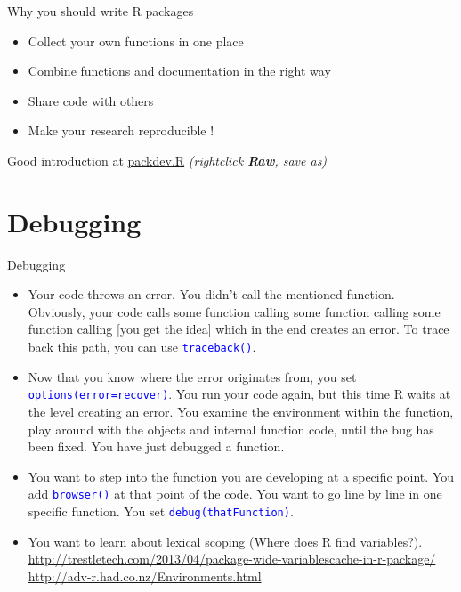 \documentclass[xcolor=table,      handout ,    xcolor=dvipsnames]{beamer}\usepackage[]{graphicx}\usepackage[]{color}
\newcommand{\rcode}[1]{\texttt{\textcolor{Blue}{#1}}}
\newcommand{\datalinkText}[1]{\href{https://github.com/brry/course/blob/master/data/#1}{#1} 
                            {\footnotesize \textit{(rightclick \textbf{Raw}, save as)}}}
\begin{document}

\begin{frame}{Why you should write R packages}
\pause
\begin{itemize}[<+->]
\item Collect your own functions in one place
\item Combine functions and documentation in the right way
\item Share code with others
\item Make your research reproducible !
\end{itemize}
\onslide<+->
\vspace{1em}
Good introduction at \datalinkText{packdev.R}
\end{frame}

\fi %


\section{Debugging}


\begin{frame}[fragile]{Debugging}
\begin{itemize}[<+->]
\item Your code throws an error.
You didn't call the mentioned function.
Obviously, your code calls some function calling some function calling some function calling [you get the idea] which in the end creates an error.
To trace back this path, you can use \rcode{traceback()}.

\item Now that you know where the error originates from, you set \rcode{options(error=recover)}.
You run your code again, but this time R waits at the level creating an error.
You examine the environment within the function, play around with the objects and internal function code, until the bug has been fixed.
You have just debugged a function.

\item You want to step into the function you are developing at a specific point.
You add \rcode{browser()} at that point of the code.
You want to go line by line in one specific function. You set \rcode{debug(thatFunction)}.

\item You want to learn about lexical scoping (Where does R find variables?).\\
\small
\href{http://trestletech.com/2013/04/package-wide-variablescache-in-r-package/}{http://trestletech.com/2013/04/package-wide-variablescache-in-r-package/}
\href{http://adv-r.had.co.nz/Environments.html}{http://adv-r.had.co.nz/Environments.html}
\end{itemize}
\end{frame}
\end{document}
